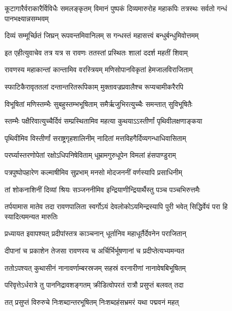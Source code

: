 \threelineshloka
{कूटागारैर्वराकारैर्विविधैः समलङ्कृतम्}
{विमानं पुष्पकं दिव्यमारुरोह महाकपिः}
{तत्रस्थः सर्वतो गन्धं पानभक्ष्यान्नसम्भवम्} %

\twolineshloka
{दिव्यं सम्मूर्च्छितं जिघ्रन् रूपवन्तमिवानिलम्}
{स गन्धस्तं महासत्त्वं बन्धुर्बन्धुमिवोत्तमम्} %

\twolineshloka
{इत एहीत्युवाचेव तत्र यत्र स रावणः}
{ततस्तां प्रस्थितः शालां ददर्श महतीं शिवाम्} %

\twolineshloka
{रावणस्य महाकान्तां कान्तामिव वरस्त्रियम्}
{मणिसोपानविकृतां हेमजालविराजिताम्} %

\twolineshloka
{स्फाटिकैरावृततलां दन्तान्तरितरूपिकाम्}
{मुक्तावज्रप्रवालैश्च रूप्यचामीकरैरपि} %

\twolineshloka
{विभूषितां मणिस्तम्भैः सुबहुस्तम्भभूषिताम्}
{समैर्ऋजुभिरत्युच्चैः समन्तात् सुविभूषितैः} %

\twolineshloka
{स्तम्भैः पक्षैरिवात्युच्चैर्दिवं सम्प्रस्थितामिव}
{महत्या कुथयाऽऽस्तीर्णां पृथिवीलक्षणाङ्कया} %

\twolineshloka
{पृथिवीमिव विस्तीर्णां सराष्ट्रगृहशालिनीम्}
{नादितां मत्तविहगैर्दिव्यगन्धाधिवासिताम्} %

\twolineshloka
{परर्घ्यास्तरणोपेतां रक्षोऽधिपनिषेविताम्}
{धूम्रामगुरुधूपेन विमलां हंसपाण्डुराम्} %

\twolineshloka
{पत्रपुष्पोपहारेण कल्माषीमिव सुप्रभाम्}
{मनसो मोदजननीं वर्णस्यापि प्रसाधिनीम्} %

\twolineshloka
{तां शोकनाशिनीं दिव्यां श्रियः सञ्जननीमिव}
{इन्द्रियाणीन्द्रियार्थैस्तु पञ्च पञ्चभिरुत्तमैः} %

\threelineshloka
{तर्पयामास मातेव तदा रावणपालिता}
{स्वर्गोऽयं देवलोकोऽयमिन्द्रस्यापि पुरी भवेत्}
{सिद्धिर्वेयं परा हि स्यादित्यमन्यत मारुतिः} %

\twolineshloka
{प्रध्यायत इवापश्यत् प्रदीपांस्तत्र काञ्चनान्}
{धूर्तानिव महाधूर्तैर्देवनेन पराजितान्} %

\twolineshloka
{दीपानां च प्रकाशेन तेजसा रावणस्य च}
{अर्चिर्भिर्भूषणानां च प्रदीप्तेत्यभ्यमन्यत} %

\twolineshloka
{ततोऽपश्यत् कुथासीनं नानावर्णाम्बरस्रजम्}
{सहस्रं वरनारीणां नानावेषबिभूषितम्} %

\twolineshloka
{परिवृत्तेऽर्धरात्रे तु पाननिद्रावशङ्गतम्}
{क्रीडित्वोपरतं रात्रौ प्रसुप्तं बलवत् तदा} %

\twolineshloka
{तत् प्रसुप्तं विरुरुचे निःशब्दान्तरभूषितम्}
{निःशब्दहंसभ्रमरं यथा पद्मवनं महत्} %

